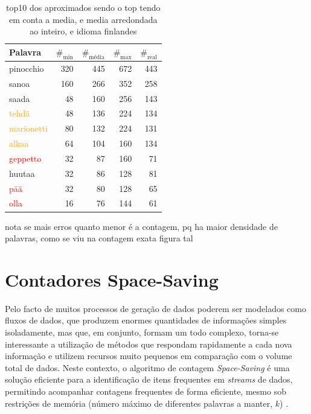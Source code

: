 \documentclass[mirror, portugues]{revdetua}
\begin{document}
\begin{table}[H]
\centering
\caption{top10 dos aproximados sendo o top tendo em conta a media, e media arredondada ao inteiro, e idioma finlandes}
\label{table:top10_aprox_finlandes}
\begin{tabular}{lrrr|r}
\toprule
Palavra & $\text{\#}_{\text{min}}$ & $\text{\#}_{\text{média}}$ & $\text{\#}_{\text{max}}$ & $\text{\#}_{\text{real}}$ \\
\midrule
pinocchio & 320 & 445 & 672 & 443 \\
sanoa & 160 & 266 & 352 & 258 \\
saada & 48 & 160 & 256 & 143 \\
\textcolor{orange}{tehdä} & 48 & 136 & 224 & 134 \\
\textcolor{orange}{marionetti} & 80 & 132 & 224 & 131 \\
\textcolor{orange}{alkaa} & 64 & 104 & 160 & 134 \\
\textcolor{red}{geppetto} & 32 & 87 & 160 & 71 \\
huutaa & 32 & 86 & 128 & 81 \\
\textcolor{red}{pää} & 32 & 80 & 128 & 65 \\
\textcolor{red}{olla} & 16 & 76 & 144 & 61 \\
\bottomrule
\end{tabular}
\end{table}

nota se mais erros quanto menor é a contagem, pq ha maior densidade de palavras, como se viu na contagem exata figura tal


\section{Contadores Space-Saving}

Pelo facto de muitos processos de geração de dados poderem ser modelados como fluxos de dados, que produzem enormes quantidades de informações simples isoladamente, mas que, em conjunto, formam um todo complexo, torna-se interessante a utilização de métodos que respondam rapidamente a cada nova informação e utilizem recursos muito pequenos em comparação com o volume total de dados. Neste contexto, o algoritmo de contagem \textit{Space-Saving} é uma solução eficiente para a identificação de itens frequentes em \textit{streams} de dados, permitindo acompanhar contagens frequentes de forma eficiente, mesmo sob restrições de memória (número máximo de diferentes palavras a manter, $k$) \cite{CG09}.
\end{document}
